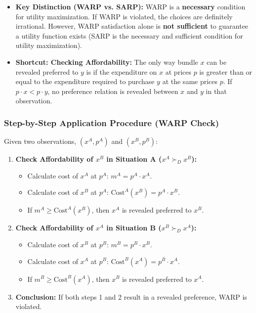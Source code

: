 \documentclass{article}
\begin{document}
\begin{itemize}
    \item \textbf{Key Distinction (WARP vs. SARP):} WARP is a \textbf{necessary} condition for utility maximization. If WARP is violated, the choices are definitely irrational. However, WARP satisfaction alone is \textbf{not sufficient} to guarantee a utility function exists (SARP is the necessary and sufficient condition for utility maximization).
    \item \textbf{Shortcut: Checking Affordability:} The only way bundle $x$ can be revealed preferred to $y$ is if the expenditure on $x$ at prices $p$ is greater than or equal to the expenditure required to purchase $y$ at the same prices $p$. If $p \cdot x < p \cdot y$, no preference relation is revealed between $x$ and $y$ in that observation.
\end{itemize}

\hrulefill

\subsubsection*{Step-by-Step Application Procedure (WARP Check)}

Given two observations, $(x^A, p^A)$ and $(x^B, p^B)$:

\begin{enumerate}
    \item \textbf{Check Affordability of $x^B$ in Situation A ($x^A \succ_D x^B$):}
    \begin{itemize}
        \item Calculate cost of $x^A$ at $p^A$: $m^A = p^A \cdot x^A$.
        \item Calculate cost of $x^B$ at $p^A$: $\text{Cost}^A(x^B) = p^A \cdot x^B$.
        \item If $m^A \geq \text{Cost}^A(x^B)$, then $x^A$ is revealed preferred to $x^B$.
    \end{itemize}
    \item \textbf{Check Affordability of $x^A$ in Situation B ($x^B \succ_D x^A$):}
    \begin{itemize}
        \item Calculate cost of $x^B$ at $p^B$: $m^B = p^B \cdot x^B$.
        \item Calculate cost of $x^A$ at $p^B$: $\text{Cost}^B(x^A) = p^B \cdot x^A$.
        \item If $m^B \geq \text{Cost}^B(x^A)$, then $x^B$ is revealed preferred to $x^A$.
    \end{itemize}
    \item \textbf{Conclusion:} If both steps 1 and 2 result in a revealed preference, WARP is violated.
\end{enumerate}
\end{document}
